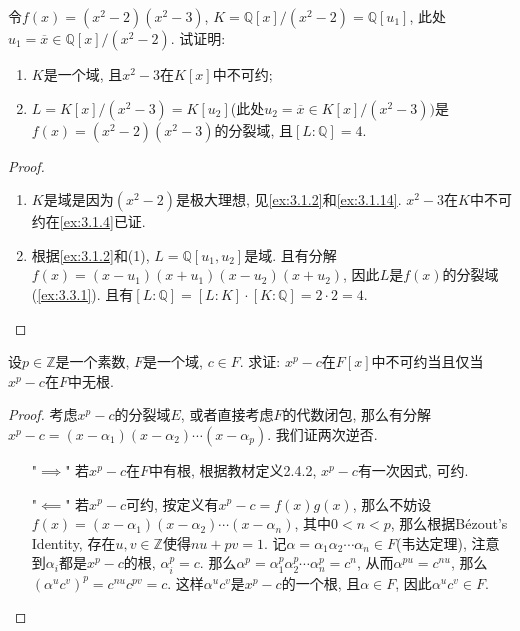 \begin{problem}
    令$f(x) = (x^2 - 2)(x^2 - 3)$, $K = \mathbb{Q}[x]/(x^2 - 2) = \mathbb{Q}[u_1]$, 此处$u_1 = \overline{x} \in \mathbb{Q}[x]/(x^2 - 2)$. 试证明: 
    \begin{enumerate}[(1)]
        \item $K$是一个域, 且$x^2 - 3$在$K[x]$中不可约;
        \item $L = K[x]/(x^2 - 3) = K[u_2]$(此处$u_2 = \overline{x} \in K[x]/(x^2 - 3))$是$f(x) = (x^2 - 2)(x^2 - 3)$的分裂域, 且$[L:\mathbb{Q}] = 4$.
    \end{enumerate}
\end{problem}

\begin{proof}
    \begin{enumerate}[(1)]
        \item $K$是域是因为$(x^2 - 2)$是极大理想, 见\ref{ex:3.1.2}和\ref{ex:3.1.14}. $x^2 - 3$在$K$中不可约在\ref{ex:3.1.4}已证.
        \item 根据\ref{ex:3.1.2}和(1), $L = \mathbb{Q}[u_1, u_2]$是域. 且有分解$f(x) = (x - u_1)(x + u_1)(x - u_2)(x + u_2)$, 因此$L$是$f(x)$的分裂域(\ref{ex:3.3.1}). 且有$[L:\mathbb{Q}] = [L:K] \cdot [K:\mathbb{Q}] = 2 \cdot 2 = 4$.
    \end{enumerate}
\end{proof}

\begin{problem}
    设$p \in \mathbb{Z}$是一个素数, $F$是一个域, $c \in F$. 求证: $x^p - c$在$F[x]$中不可约当且仅当$x^p - c$在$F$中无根.
\end{problem}

\begin{proof}
    考虑$x^p - c$的分裂域$E$, 或者直接考虑$F$的代数闭包, 那么有分解$x^p - c = (x - \alpha_1)(x - \alpha_2) \cdots (x - \alpha_p)$. 我们证两次逆否.
    \begin{enumerate}
        \item["$\implies$"] 若$x^p - c$在$F$中有根, 根据教材定义2.4.2, $x^p - c$有一次因式, 可约.
        \item["$\impliedby$"] 若$x^p - c$可约, 按定义有$x^p - c = f(x)g(x)$, 那么不妨设$f(x) = (x - \alpha_1)(x - \alpha_2) \cdots (x - \alpha_n)$, 其中$0 < n < p$, 那么根据Bézout's Identity, 存在$u, v \in \mathbb{Z}$使得$nu + pv = 1$. 记$\alpha = \alpha_1\alpha_2 \cdots \alpha_n \in F$(韦达定理), 注意到$\alpha_i$都是$x^p - c$的根, $\alpha_i^p = c$. 那么$\alpha^p = \alpha_1^p\alpha_2^p \cdots \alpha_n^p = c^n$, 从而$\alpha^{pu} = c^{nu}$, 那么$(\alpha^uc^v)^p = c^{nu}c^{pv} = c$. 这样$\alpha^uc^v$是$x^p - c$的一个根, 且$\alpha \in F$, 因此$\alpha^uc^v \in F$.
    \end{enumerate}
\end{proof}

